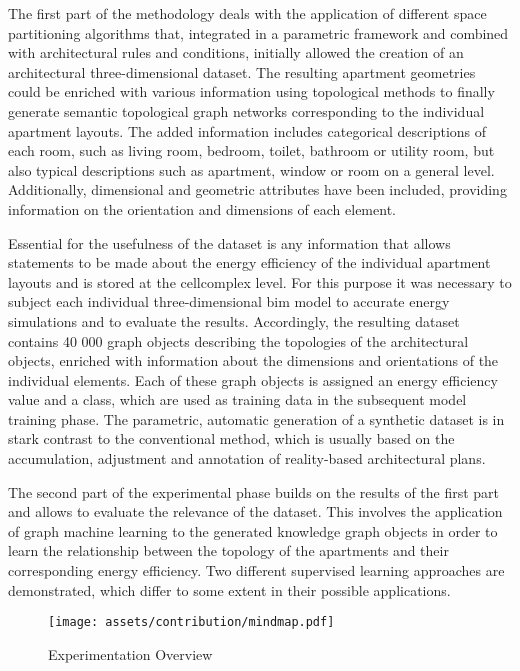 \documentclass[a4paper, 12pt]{report}
\begin{document}
The first part of the methodology deals with the application of different space partitioning algorithms that, integrated in a parametric framework and combined with architectural rules and conditions, initially allowed the creation of an architectural three-dimensional dataset. The resulting apartment geometries could be enriched with various information using topological methods to finally generate semantic topological graph networks corresponding to the individual apartment layouts. The added information includes categorical descriptions of each room, such as living room, bedroom, toilet, bathroom or utility room, but also typical descriptions such as apartment, window or room on a general level. Additionally, dimensional and geometric attributes have been included, providing information on the orientation and dimensions of each element.

Essential for the usefulness of the dataset is any information that allows statements to be made about the energy efficiency of the individual apartment layouts and is stored at the \gls{cellcomplex} level. For this purpose it was necessary to subject each individual three-dimensional \acrshort{bim} model to accurate energy simulations and to evaluate the results. Accordingly, the resulting dataset contains 40 000 graph objects describing the topologies of the architectural objects, enriched with information about the dimensions and orientations of the individual elements. Each of these graph objects is assigned an energy efficiency value and a class, which are used as training data in the subsequent model training phase. The parametric, automatic generation of a synthetic dataset is in stark contrast to the conventional method, which is usually based on the accumulation, adjustment and annotation of reality-based architectural plans.

The second part of the experimental phase builds on the results of the first part and allows to evaluate the relevance of the dataset. This involves the application of graph machine learning to the generated \gls{knowledge graph} objects in order to learn the relationship between the topology of the apartments and their corresponding energy efficiency. Two different supervised learning approaches are demonstrated, which differ to some extent in their possible applications.

\begin{figure}
\centering
\texttt{[image: assets/contribution/mindmap.pdf]}
\caption{Experimentation Overview}
\label{fig:process-overview}
\end{figure}
\end{document}

